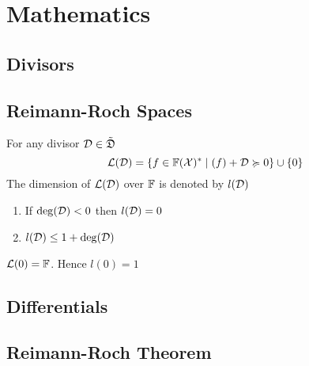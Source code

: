 \chapter{Mathematics}
\section{Divisors}
\section{Reimann-Roch Spaces}
\begin{definition}
	For any divisor $\mathcal{D}\in \tilde{\mathfrak{D}}$ $$\mathcal{L}(\mathcal{D})=\{f\in \mathbb{F}(\mathcal{X})^*\mid (f)+\mathcal{D}\succcurlyeq 0 \}\cup \{0\}$$The dimension of $\mathcal{L}(\mathcal{D})$ over $\mathbb{F}$ is denoted by $l(\mathcal{D})$
\end{definition}
\begin{theorem}
	\begin{enumerate}[label=(\roman*)]\label{rrspacedim}
		\item If $\deg(\mathcal{D})<0$ then $l(\mathcal{D})=0$
		\item $l(\mathcal{D})\leq 1+\deg(\mathcal{D})$
	\end{enumerate}
\end{theorem}
\begin{theorem}\label{0divrrspacedim}
	$\mathcal{L}(0)=\mathbb{F}$. Hence $l(0)=1$
\end{theorem}

\section{Differentials}

\section{Reimann-Roch Theorem}

